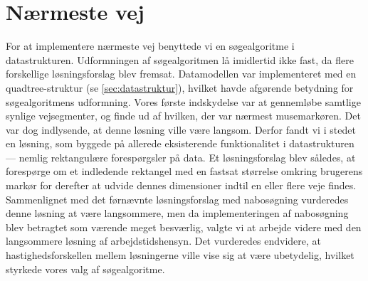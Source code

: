 \section{Nærmeste vej}
For at implementere nærmeste vej benyttede vi en søgealgoritme i datastrukturen. Udformningen af søgealgoritmen lå imidlertid ikke fast, da flere forskellige løsningsforslag blev fremsat. Datamodellen var implementeret med en quadtree-struktur (se \ref{sec:datastruktur}), hvilket havde afgørende betydning for søgealgoritmens udformning. Vores første indskydelse var at gennemløbe samtlige synlige vejsegmenter, og finde ud af hvilken, der var nærmest musemarkøren. Det var dog indlysende, at denne løsning ville være langsom. Derfor fandt vi i stedet en løsning, som byggede på allerede eksisterende funktionalitet i datastrukturen --- nemlig rektangulære forespørgsler på data. Et løsningsforslag blev således, at forespørge om et indledende rektangel med en fastsat størrelse omkring brugerens markør for derefter at udvide dennes dimensioner indtil en eller flere veje findes. Sammenlignet med det førnævnte løsningsforslag med nabosøgning vurderedes denne løsning at være langsommere, men da implementeringen af nabosøgning blev betragtet som værende meget besværlig, valgte vi at arbejde videre med den langsommere løsning af arbejdstidshensyn. Det vurderedes endvidere, at hastighedsforskellen mellem løsningerne ville vise sig at være ubetydelig, hvilket styrkede vores valg af søgealgoritme.